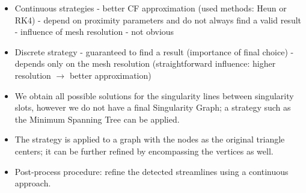 \documentclass[a0paper,portrait, fontscale=0.33]{baposter}
\begin{document}
\begin{poster}
{\noindent
\begin{minipage}[b]{0.49\linewidth}
\begin{tcolorbox}[colframe=gray,boxrule=0.1pt,title=\Large Conclusions]	
\begin{itemize}
\item Continuous strategies 
\newline
 - better CF approximation (used methods: Heun or RK4)
 \newline
 - depend on proximity parameters and do not always find a valid result
 \newline
 - influence of mesh resolution - not obvious
\item Discrete strategy
\newline 
- guaranteed to find a result (importance of final choice)
\newline
- depends only on the mesh resolution (straightforward influence: higher resolution $\rightarrow$ better approximation) 
\end{itemize}
\end{tcolorbox}
\end{minipage}
\hspace{0.005\linewidth}
\begin{minipage}[b]{0.49\linewidth}
\begin{tcolorbox}[colframe=gray,boxrule=0.1pt,title=\Large Perspectives - Discrete Strategy]	
\begin{itemize}
\item We obtain all possible solutions for the singularity lines between singularity slots, however we do not have a final Singularity Graph; a strategy such as the Minimum Spanning Tree can be applied. 
\item The strategy is applied to a graph with the nodes as the original triangle centers; it can be further refined by encompassing the vertices as well.
\item Post-process procedure: refine the detected streamlines using a continuous approach. 
\end{itemize}
\end{tcolorbox}
\end{minipage}
}



%

\end{poster}
\end{document}

